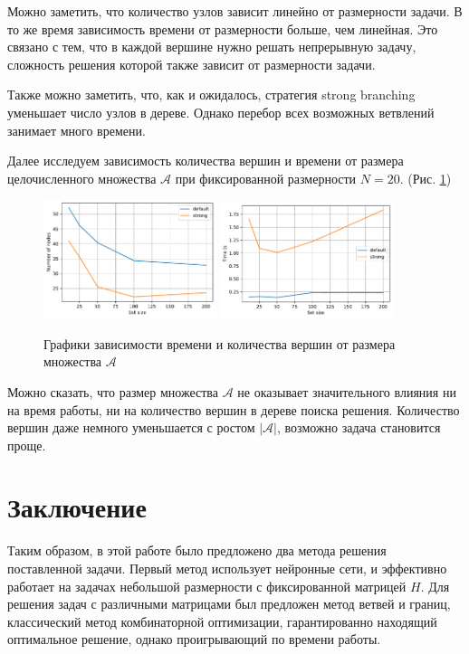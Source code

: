 \documentclass[12pt]{article}
\begin{document}
Можно заметить, что количество узлов зависит линейно от размерности задачи. В то же время зависимость времени от размерности больше, чем линейная. Это связано с тем, что в каждой вершине нужно решать непрерывную задачу, сложность решения которой также зависит от размерности задачи.

Также можно заметить, что, как и ожидалось, стратегия strong branching уменьшает число узлов в дереве. Однако перебор всех возможных ветвлений занимает много времени.

Далее исследуем зависимость количества вершин и времени от размера целочисленного множества $\mathcal{A}$ при фиксированной размерности $N = 20$. (Рис. \ref{branch_and_bound_set_size})
\begin{figure}[H]
    \centering
    \includegraphics[width=0.45\textwidth]{branch_and_bound_n_nodes_set_size.pdf}
    \quad
    \includegraphics[width=0.45\textwidth]{branch_and_bound_time_set_size.pdf}
    \caption{Графики зависимости времени и количества вершин от размера множества $\mathcal{A}$}
    \label{branch_and_bound_set_size}
\end{figure}

Можно сказать, что размер множества $\mathcal{A}$ не оказывает значительного влияния ни на время работы, ни на количество вершин в дереве поиска решения. Количество вершин даже немного уменьшается с ростом $|\mathcal{A}|$, возможно задача становится проще.

\section{Заключение}
Таким образом, в этой работе было предложено два метода решения поставленной задачи. Первый метод использует нейронные сети, и эффективно работает на задачах небольшой размерности с фиксированной матрицей $H$. Для решения задач с различными матрицами был предложен метод ветвей и границ, классический метод комбинаторной оптимизации, гарантированно находящий оптимальное решение, однако проигрывающий по времени работы.
\end{document}

